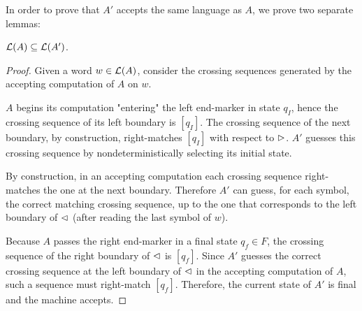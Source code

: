 In order to prove that $A'$ accepts the same language as $A$, we prove two separate lemmas:
\begin{lemm}\label{lem:2DFAto1NFA-1}
	$\mathcal L(A)\subseteq\mathcal L(A')$.
\end{lemm}
\begin{proof}
	Given a word $w\in\mathcal L(A)$, consider the crossing sequences generated by the accepting computation of $A$ on $w$.

	$A$ begins its computation "entering" the left end-marker in state $q_I$, hence the crossing sequence of its left boundary is $[q_I]$.
	The crossing sequence of the next boundary, by construction, right-matches $[q_I]$ with respect to $\rhd$.
	$A'$ guesses this crossing sequence by nondeterministically selecting its initial state.

	By construction, in an accepting computation each crossing sequence right-matches the one at the next boundary.
	Therefore $A'$ can guess, for each symbol, the correct matching crossing sequence, up to the one that corresponds to the left boundary of $\lhd$ (after reading the last symbol of $w$).

	Because $A$ passes the right end-marker in a final state $q_f\in F$, the crossing sequence of the right boundary of $\lhd$ is $[q_f]$.
	Since $A'$ guesses the correct crossing sequence at the left boundary of $\lhd$ in the accepting computation of $A$, such a sequence must right-match $[q_f]$.
	Therefore, the current state of $A'$ is final and the machine accepts.
\end{proof}


